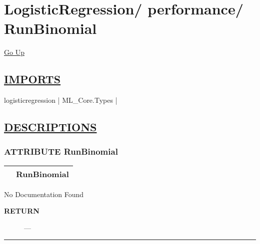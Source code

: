 \chapter*{\color{headfile}
{\large LogisticRegression\slash\hspace{0pt}}
{\large performance\slash\hspace{0pt}}
 \\
RunBinomial
}
\hypertarget{ecldoc:toc:LogisticRegression.performance.RunBinomial}{}
\hyperlink{ecldoc:toc:root/LogisticRegression/performance}{Go Up}

\section*{\underline{\textsf{IMPORTS}}}
\begin{doublespace}
{\large
logisticregression |
ML\_Core.Types |
}
\end{doublespace}

\section*{\underline{\textsf{DESCRIPTIONS}}}
\subsection*{\textsf{\colorbox{headtoc}{\color{white} ATTRIBUTE}
RunBinomial}}

\hypertarget{ecldoc:logisticregression.performance.runbinomial}{}

{\renewcommand{\arraystretch}{1.5}
\begin{tabularx}{\textwidth}{|>{\raggedright\arraybackslash}l|X|}
\hline
\hspace{0pt}\mytexttt{\color{red} } & \textbf{RunBinomial} \\
\hline
\end{tabularx}
}

\par





No Documentation Found








\par
\begin{description}
\item [\colorbox{tagtype}{\color{white} \textbf{\textsf{RETURN}}}] \textbf{} --- 
\end{description}




\rule{\linewidth}{0.5pt}
